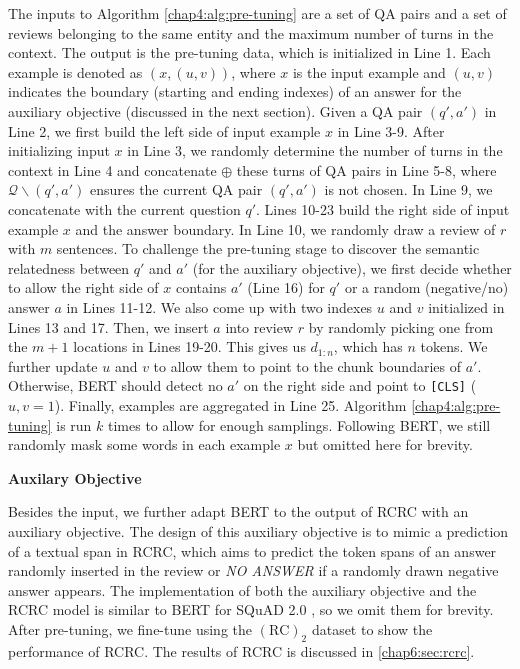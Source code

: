 The inputs to Algorithm \ref{chap4:alg:pre-tuning} are a set of QA pairs and a set of reviews belonging to the same entity and the maximum number of turns in the context. The output is the pre-tuning data, which is initialized in Line 1. 
Each example is denoted as $(x, (u, v))$, where $x$ is the input example and $(u, v)$ indicates the boundary (starting and ending indexes) of an answer for the auxiliary objective (discussed in the next section).
Given a QA pair $(q', a')$ in Line 2, we first build the left side of input example $x$ in Line 3-9.
After initializing input $x$ in Line 3, we randomly determine the number of turns in the context in Line 4 and concatenate $\oplus$ these turns of QA pairs in Line 5-8, where $\mathcal{Q}\backslash(q', a')$ ensures the current QA pair $(q', a')$ is not chosen.
In Line 9, we concatenate with the current question $q'$.
Lines 10-23 build the right side of input example $x$ and the answer boundary.
In Line 10, we randomly draw a review of $r$ with $m$ sentences. To challenge the pre-tuning stage to discover the semantic relatedness between $q'$ and $a'$ (for the auxiliary objective), we first decide whether to allow the right side of $x$ contains $a'$ (Line 16) for $q'$ or a random (negative/no) answer $a$ in Lines 11-12.
We also come up with two indexes $u$ and $v$ initialized in Lines 13 and 17.
Then, we insert $a$ into review $r$ by randomly picking one from the $m+1$ locations in Lines 19-20.
This gives us $d_{1:n}$, which has $n$ tokens. 
We further update $u$ and $v$ to allow them to point to the chunk boundaries of $a'$.
Otherwise, BERT should detect no $a'$ on the right side and point to \texttt{[CLS]} ($u,v=1$). Finally, examples are aggregated in Line 25.
Algorithm \ref{chap4:alg:pre-tuning} is run $k$ times to allow for enough samplings. 
Following BERT, we still randomly mask some words in each example $x$ but omitted here for brevity.

\textbf{Auxilary Objective}
\label{chap4:sec:aux}

Besides the input, we further adapt BERT to the output of RCRC with an auxiliary objective.
The design of this auxiliary objective is to mimic a prediction of a textual span in RCRC, which aims to predict the token spans of an answer randomly inserted in the review or \textit{NO ANSWER} if a randomly drawn negative answer appears.
The implementation of both the auxiliary objective and the RCRC model is similar to BERT for SQuAD 2.0 \cite{rajpurkar2018know}, so we omit them for brevity.
After pre-tuning, we fine-tune using the $(\text{RC})_2$ dataset to show the performance of RCRC.
The results of RCRC is discussed in \ref{chap6:sec:rcrc}.


